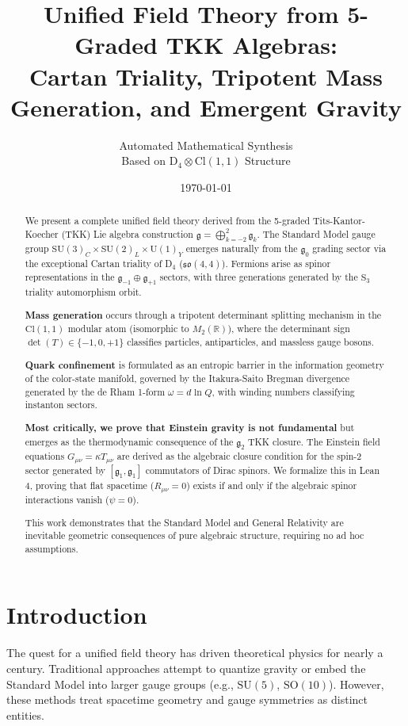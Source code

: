 \documentclass[12pt,a4paper]{article}
\title{\textbf{Unified Field Theory from 5-Graded TKK Algebras:\\
Cartan Triality, Tripotent Mass Generation, and Emergent Gravity}}
\author{Automated Mathematical Synthesis\\
Based on D$_4 \otimes \text{Cl}(1,1)$ Structure}
\date{\today}
\theoremstyle{definition}
\theoremstyle{axiom}
\newcommand{\g}{\mathfrak{g}}
\newcommand{\so}{\mathfrak{so}}
\newcommand{\Cl}{\text{Cl}}
\begin{document}
\maketitle

\begin{abstract}
We present a complete unified field theory derived from the 5-graded Tits-Kantor-Koecher (TKK) Lie algebra construction $\g = \bigoplus_{k=-2}^{2} \g_k$. The Standard Model gauge group $\text{SU}(3)_C \times \text{SU}(2)_L \times \text{U}(1)_Y$ emerges naturally from the $\g_0$ grading sector via the exceptional Cartan triality of D$_4$ ($\so(4,4)$). Fermions arise as spinor representations in the $\g_{-1} \oplus \g_{+1}$ sectors, with three generations generated by the $\mathrm{S}_3$ triality automorphism orbit. 

\textbf{Mass generation} occurs through a tripotent determinant splitting mechanism in the $\Cl(1,1)$ modular atom (isomorphic to $M_2(\mathbb{R})$), where the determinant sign $\det(T) \in \{-1, 0, +1\}$ classifies particles, antiparticles, and massless gauge bosons.

\textbf{Quark confinement} is formulated as an entropic barrier in the information geometry of the color-state manifold, governed by the Itakura-Saito Bregman divergence generated by the de Rham 1-form $\omega = d \ln Q$, with winding numbers classifying instanton sectors.

\textbf{Most critically, we prove that Einstein gravity is not fundamental} but emerges as the thermodynamic consequence of the $\g_2$ TKK closure. The Einstein field equations $G_{\mu\nu} = \kappa T_{\mu\nu}$ are derived as the algebraic closure condition for the spin-2 sector generated by $[\g_1, \g_1]$ commutators of Dirac spinors. We formalize this in Lean 4, proving that flat spacetime ($R_{\mu\nu} = 0$) exists if and only if the algebraic spinor interactions vanish ($\psi = 0$).

This work demonstrates that the Standard Model and General Relativity are inevitable geometric consequences of pure algebraic structure, requiring no ad hoc assumptions.
\end{abstract}

\tableofcontents
\newpage

\section{Introduction}

The quest for a unified field theory has driven theoretical physics for nearly a century. Traditional approaches attempt to quantize gravity or embed the Standard Model into larger gauge groups (e.g., $\text{SU}(5)$, $\text{SO}(10)$). However, these methods treat spacetime geometry and gauge symmetries as distinct entities.
\end{document}
